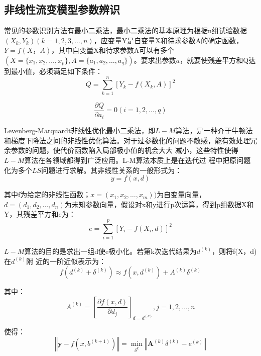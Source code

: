 \subsection{非线性流变模型参数辨识}
常见的参数识别方法有最小二乘法，最小二乘法的基本原理为根据n组试验数据$(X_k,Y_k)(k=1,2,3,\dots,n)$，应变量Y是自变量X和待求参数A的确定函数，$Y=f(X，A)$，其中自变量X和待求参数A可以有多个$(X=\{x_1,x_2,…,x_p\},A=\{a_1,a_2,…,a_q\})$。要求出参数$a$，就要使残差平方和Q达到最小值，必须满足如下条件：
\begin{equation}
    Q=\sum_{k=1}^n[Y_k-f(X_k,A)]^2
\end{equation}

\begin{equation}
    \frac{\partial{Q}}{\partial{a_i}}=0(i=1,2,\dots,q)
\end{equation}

Levenberg-Marquardt非线性优化最小二乘法，即$L-M$算法，是一种介于牛顿法和梯度下降法之间的非线性优化算法。对于过参数化的问题不敏感，能有效处理冗余参数的问题，使代价函数陷入局部极小值的机会大大
减小，这些特性使得$L-M$算法在各领域都得到广泛应用。L-M算法本质上是在迭代过
程中把原问题化为多个$LS$问题进行求解。其非线性关系的一般形式为：
\begin{equation}
    y=f(x,d)
\end{equation}

其中f为给定的非线性函数；$x=(x_1,x_2,\dots,x_m))$为自变量向量，$d=(d_1,d_2,\dots,d_n)$为未知参数向量，假设对x和y进行p次运算，得到p组数据X和Y，其残差平方和e为：
\begin{equation}
    e=\sum_{i=1}^p[Y_i-f(X_i,d)]^2
\end{equation}

$L-M$算法的目的是求出一组d使e极小化。若第k次迭代结果为$d^(k)$，则将f(X，d)在$d^(k)$附
近的一阶近似表示为：
\begin{equation}
    f(d^{(k)}+\delta^{(k)})\approx f(x,d^{(k)})+A^{(k)}\delta^{(k)}
\end{equation}

其中：
\begin{equation}
    A^{(k)}=[\frac{\partial{f(x,d)}}{\partial{d_j}}]_{d=d^{(k)}},j=1,2,\dots,n
\end{equation}

使得：
\begin{equation}
    {\left\Vert{\boldsymbol y-f(x,b^{(k+1)})}\right\Vert}=\mathop{\min}_{\delta^k}{\left\Vert{\boldsymbol A^{(k)}\delta^{(k)}-e^{(k)}}\right\Vert}
\end{equation}

